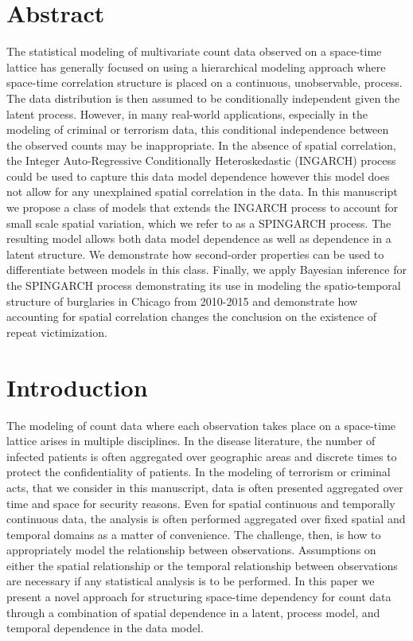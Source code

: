 \documentclass[11pt]{isuthesis}
\begin{document}
\section*{Abstract}
	The statistical modeling of multivariate count data observed on a space-time lattice has generally focused on using a hierarchical modeling approach where space-time correlation structure is placed on a continuous, unobservable, process.  The data distribution is then assumed to be conditionally independent given the latent process.  However, in many real-world applications, especially in the modeling of criminal or terrorism data, this conditional independence between the observed counts may be inappropriate.  In the absence of spatial correlation, the Integer Auto-Regressive Conditionally Heteroskedastic (INGARCH) process could be used to capture this data model dependence however this model does not allow for any unexplained spatial correlation in the data. In this manuscript we propose a class of models that extends the INGARCH process to account for small scale spatial variation, which we refer to as a SPINGARCH process. The resulting model allows both data model dependence as well as dependence in a latent structure.  We demonstrate how second-order properties can be used to differentiate between models in this class.  Finally, we apply Bayesian inference for the SPINGARCH process demonstrating its use in modeling the spatio-temporal structure of burglaries in Chicago from 2010-2015 and demonstrate how accounting for spatial correlation changes the conclusion on the existence of repeat victimization.


\section{Introduction} 

The modeling of count data where each observation takes place on a space-time lattice arises in multiple disciplines.  In the disease literature, the number of infected patients is often aggregated over geographic areas and discrete times to protect the confidentiality of patients.  In the modeling of terrorism or criminal acts, that we consider in this manuscript, data is often presented aggregated over time and space for security reasons.  Even for spatial continuous and temporally continuous data, the analysis is often performed aggregated over fixed spatial and temporal domains as a matter of convenience.  The challenge, then, is how to appropriately model the relationship between observations.  Assumptions on either the spatial relationship or the temporal relationship between observations are necessary if any statistical analysis is to be performed.  In this paper we present a novel approach for structuring space-time dependency for count data through a combination of spatial dependence in a latent, process model, and temporal dependence in the data model.
\end{document}
